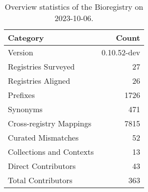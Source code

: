 \begin{table}
\caption{Overview statistics of the Bioregistry on 2023-10-06.}
\label{tab:bioregistry-summary}
\begin{tabular}{lr}
\toprule
Category & Count \\
\midrule
Version & 0.10.52-dev \\
Registries Surveyed & 27 \\
Registries Aligned & 26 \\
Prefixes & 1726 \\
Synonyms & 471 \\
Cross-registry Mappings & 7815 \\
Curated Mismatches & 52 \\
Collections and Contexts & 13 \\
Direct Contributors & 43 \\
Total Contributors & 363 \\
\bottomrule
\end{tabular}
\end{table}
